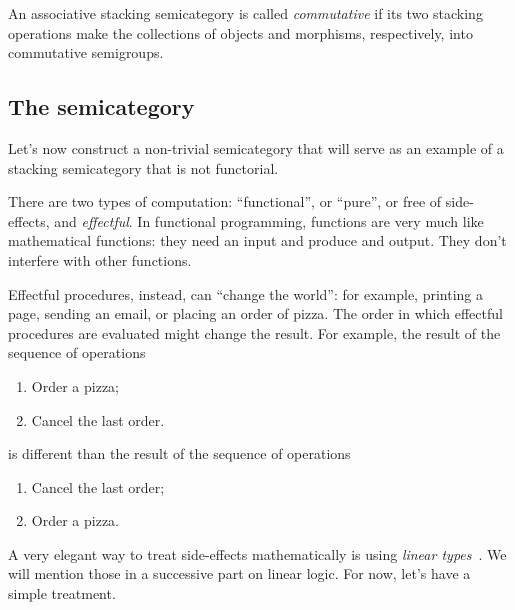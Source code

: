 %
\begin{definition}
    An associative stacking semicategory is called \emph{commutative} if its two stacking operations make the collections of objects and morphisms, respectively, into commutative semigroups.
\end{definition}

\subsection{The semicategory \Effects}

Let's now construct a non-trivial semicategory that will serve as an example of a stacking semicategory that is not functorial.

There are two types of computation: ``functional'', or ``pure'', or free of side-effects, and \emph{effectful}.
In functional programming, functions are very much like mathematical functions: they need an input and produce and output.
They don't interfere with other functions.

Effectful procedures,  instead, can ``change the world'': for example, printing a page, sending an email, or placing an order of pizza.
The order in which effectful procedures are evaluated might change the result.
For example, the result of the sequence of operations
%
\begin{enumerate}
    \item Order a pizza;
    \item Cancel the last order.
\end{enumerate}
%
is different than the result of the sequence of operations
%
\begin{enumerate}
    \item Cancel the last order;
    \item Order a pizza.
\end{enumerate}

A very elegant way to treat side-effects mathematically is using \emph{linear types}~\cite{Wadler90lineartypes}.
We will mention those in a successive part on linear logic.
For now, let's have a simple treatment.

\begin{marginfigure}
    \centering
    \\
    \caption{}
    \label{fig:effects12}
\end{marginfigure}


